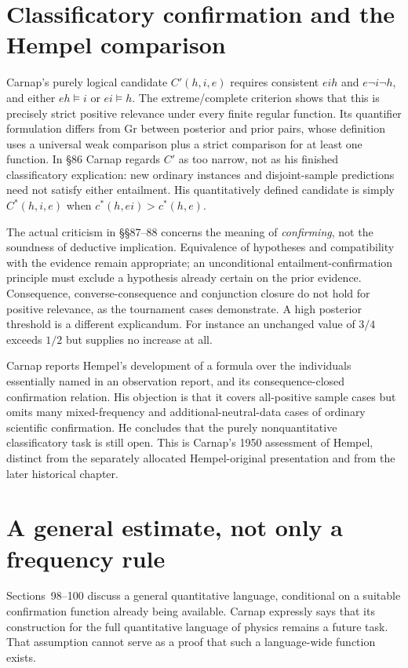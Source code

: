 \section{Classificatory confirmation and the Hempel comparison}
\label{sec:p15-carnap-classificatory}

Carnap's purely logical candidate \(C'(h,i,e)\) requires consistent
\(eih\) and \(e\neg i\neg h\), and either
\(eh\models i\) or \(ei\models h\). The extreme/complete
criterion shows that this is precisely strict positive relevance under
every finite regular function. Its quantifier formulation differs from
Gr between posterior
and prior pairs, whose definition uses a universal weak comparison plus
a strict comparison for at least one function. In §86 Carnap regards
\(C'\) as too narrow, not as his finished classificatory explication:
new ordinary instances and disjoint-sample predictions need not satisfy
either entailment. His quantitatively defined candidate is simply
\(C^*(h,i,e)\) when \(c^*(h,ei)>c^*(h,e)\).

The actual criticism in §§87--88 concerns the meaning of
\emph{confirming}, not the soundness of deductive implication.
Equivalence of hypotheses and compatibility with the evidence remain
appropriate; an unconditional entailment-confirmation principle must
exclude a hypothesis already certain on the prior evidence. Consequence,
converse-consequence and conjunction closure do not hold for positive
relevance, as the tournament cases demonstrate. A high posterior threshold
is a different explicandum. For instance an unchanged value of \(3/4\)
exceeds \(1/2\) but supplies no increase at all.

Carnap reports Hempel's development of a formula over the individuals
essentially named in an observation report, and its consequence-closed
confirmation relation. His objection is that it covers all-positive
sample cases but omits many mixed-frequency and additional-neutral-data
cases of ordinary scientific confirmation. He concludes that the purely
nonquantitative classificatory task is still open. This is Carnap's
1950 assessment of Hempel, distinct from the separately allocated
Hempel-original presentation and from the later historical chapter.

\section{A general estimate, not only a frequency rule}
\label{sec:p15-carnap-general-estimation}

Sections~98--100 discuss a general quantitative language, conditional
on a suitable confirmation function already being available. Carnap
expressly says that its construction for the full quantitative language
of physics remains a future task. That assumption cannot serve as a
proof that such a language-wide function exists.

